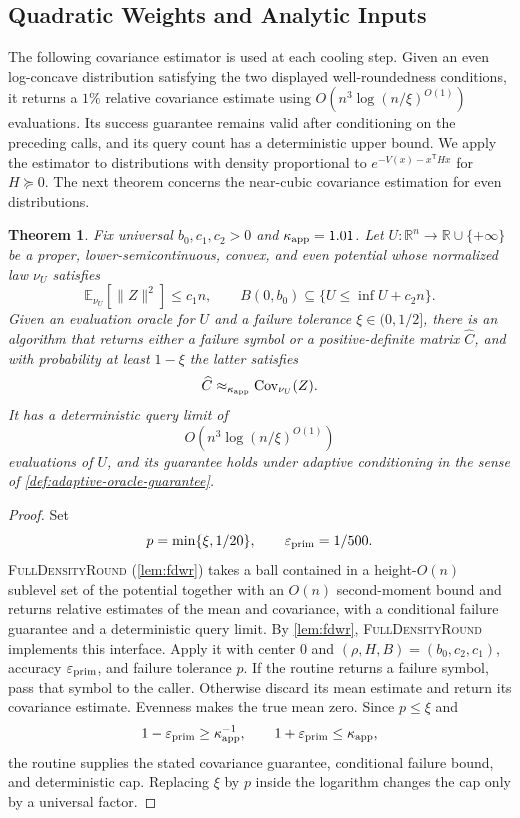 \documentclass[11pt]{article}
\numberwithin{equation}{section}
\newtheorem{theorem}{Theorem}
\theoremstyle{definition}
\newcommand{\E}[2]{\mathbb{E}_{#1}\left[#2\right]}
\newcommand{\algname}[1]{\textnormal{\textsc{#1}}}
\begin{document}
\subsection{Quadratic Weights and Analytic Inputs}
\label{sec:symmetric-inputs}

The following covariance estimator is used at each cooling step.
Given an even log-concave distribution satisfying the two displayed
well-roundedness conditions, it returns a $1\%$ relative covariance estimate
using
$O(n^3\log(n/\xi)^{O(1)})$ evaluations.
Its success guarantee remains valid after conditioning on the preceding calls,
and its query count has a deterministic upper bound.
We apply the estimator to distributions with density proportional to
$e^{-V(x)-x^{\mathsf T}Hx}$ for
$H\succeq0$.
The next theorem concerns the near-cubic covariance estimation for even
distributions.

\begin{theorem}
\label{run01:thm:primitive}
Fix universal $b_0,c_1,c_2>0$ and
$\kappa_{\rm app}=1.01$.
Let $U:\mathbb R^n\to\mathbb R\cup\{+\infty\}$ be a proper,
lower-semicontinuous, convex, and even potential whose normalized law
$\nu_U$ satisfies
\[
 \E{\nu_U}{\|Z\|^2}\leq c_1n,
 \qquad
 B(0,b_0)\subseteq\{U\leq\inf U+c_2n\}.
\]
Given an evaluation oracle for $U$ and a failure tolerance
$\xi\in(0,1/2]$, there is an algorithm that returns either a failure symbol or a
positive-definite matrix
$\widehat C$, and with probability at least
$1-\xi$ the latter satisfies
\[
 \widehat C\approx_{\kappa_{\rm app}}
 \operatorname{Cov}_{\nu_U}(Z).
\]
It has a deterministic query limit of
\[
 O\!\left(n^3\log(n/\xi)^{O(1)}\right)
\]
evaluations of $U$, and its guarantee holds under adaptive conditioning in the
sense of \cref{def:adaptive-oracle-guarantee}.
\end{theorem}

\begin{proof}
Set
\[
p=\min\{\xi,1/20\},
\qquad
\varepsilon_{\rm prim}=1/500.
\]
\algname{FullDensityRound} (\cref{lem:fdwr}) takes a ball contained in a
height-$O(n)$ sublevel set of the potential together with an
$O(n)$ second-moment bound and returns relative estimates of the mean and
covariance, with a conditional failure guarantee and a deterministic query
limit.
By \cref{lem:fdwr}, \algname{FullDensityRound} implements this interface.
Apply it with center $0$ and
$(\rho,H,B)=(b_0,c_2,c_1)$, accuracy
$\varepsilon_{\rm prim}$, and failure tolerance
$p$.
If the routine returns a failure symbol, pass that symbol to the caller.
Otherwise discard its mean estimate and return its covariance estimate.
Evenness makes the true mean zero.
Since $p\leq\xi$ and
\[
1-\varepsilon_{\rm prim}\geq\kappa_{\rm app}^{-1},
\qquad
1+\varepsilon_{\rm prim}\leq\kappa_{\rm app},
\]
the routine supplies the stated covariance guarantee, conditional failure bound,
and deterministic cap.
Replacing $\xi$ by
$p$ inside the logarithm changes the cap only by a universal factor.
\end{proof}
\end{document}
